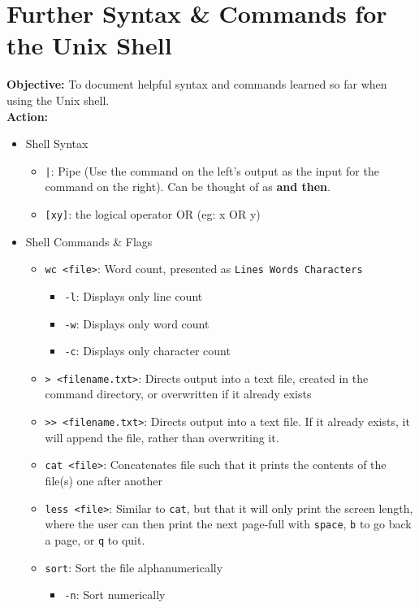 \documentclass{article}
\begin{document}
\section{Further Syntax \& Commands for the Unix Shell}
\textbf{Objective:} To document helpful syntax and commands learned so far when using the Unix shell.\\
\textbf{Action:}
\begin{itemize}
    \item Shell Syntax
    \begin{itemize}
        \item \texttt{|}: Pipe (Use the command on the left's output as the input for the command on the right). Can be thought of as \textbf{and then}.
        \item \texttt{[xy]}: the logical operator OR (eg: x OR y) 
    \end{itemize}
    \item Shell Commands \& Flags
    \begin{itemize}
        \item \texttt{wc <file>}: Word count, presented as \texttt{Lines Words Characters}
        \begin{itemize}
            \item \texttt{-l}: Displays only line count
            \item \texttt{-w}: Displays only word count
            \item \texttt{-c}: Displays only character count
        \end{itemize}
        \item \verb|> <filename.txt>|: Directs output into a text file, created in the command directory, or overwritten if it already exists
        \item \verb|>> <filename.txt>|: Directs output into a text file. If it already exists, it will append the file, rather than overwriting it.
        \item \texttt{cat <file>}: Concatenates file such that it prints the contents of the file(s) one after another
        \item \texttt{less <file>}: Similar to \texttt{cat}, but that it will only print the screen length, where the user can then print the next page-full with \texttt{space}, \texttt{b} to go back a page, or \texttt{q} to quit.
        \item \texttt{sort}: Sort the file alphanumerically
        \begin{itemize}
            \item \verb|-n|: Sort numerically

\end{itemize}
\end{itemize}
\end{itemize}
\end{document}
